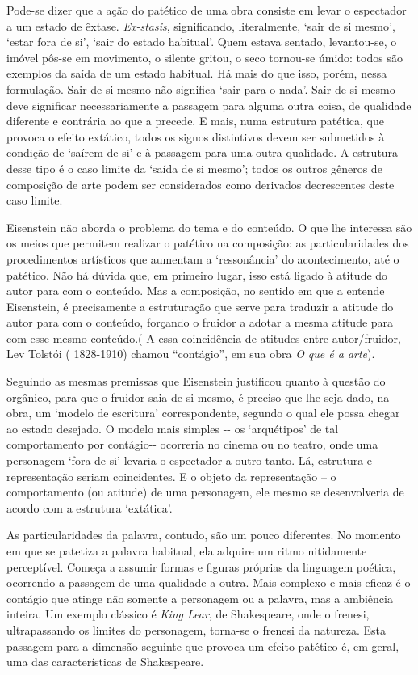 Pode-se dizer que a ação do patético de uma obra consiste em levar o
espectador a um estado de êxtase. \emph{Ex-stasis}, significando,
literalmente, `sair de si mesmo', `estar fora de si', `sair do estado
habitual'. Quem estava sentado, levantou-se, o imóvel pôs-se em
movimento, o silente gritou, o seco tornou-se úmido: todos são exemplos
da saída de um estado habitual. Há mais do que isso, porém, nessa
formulação. Sair de si mesmo não significa `sair para o nada'. Sair de
si mesmo deve significar necessariamente a passagem para alguma outra
coisa, de qualidade diferente e contrária ao que a precede. E mais, numa
estrutura patética, que provoca o efeito extático, todos os signos
distintivos devem ser submetidos à condição de `saírem de si' e à
passagem para uma outra qualidade. A estrutura desse tipo é o caso
limite da `saída de si mesmo'; todos os outros gêneros de composição de
arte podem ser considerados como derivados decrescentes deste caso
limite.

Eisenstein não aborda o problema do tema e do conteúdo. O que lhe
interessa são os meios que permitem realizar o patético na composição:
as particularidades dos procedimentos artísticos que aumentam a
`ressonância' do acontecimento, até o patético. Não há dúvida que, em
primeiro lugar, isso está ligado à atitude do autor para com o conteúdo.
Mas a composição, no sentido em que a entende Eisenstein, é precisamente
a estruturação que serve para traduzir a atitude do autor para com o
conteúdo, forçando o fruidor a adotar a mesma atitude para com esse
mesmo conteúdo.( A essa coincidência de atitudes entre autor/fruidor,
Lev Tolstói ( 1828-1910) chamou ``contágio'', em sua obra \emph{O que é
a arte}).

Seguindo as mesmas premissas que Eisenstein justificou quanto à questão
do orgânico, para que o fruidor saia de si mesmo, é preciso que lhe seja
dado, na obra, um `modelo de escritura' correspondente, segundo o qual
ele possa chegar ao estado desejado. O modelo mais simples -\/- os
`arquétipos' de tal comportamento por contágio-\/- ocorreria no cinema
ou no teatro, onde uma personagem `fora de si' levaria o espectador a
outro tanto. Lá, estrutura e representação seriam coincidentes. E o
objeto da representação -- o comportamento (ou atitude) de uma
personagem, ele mesmo se desenvolveria de acordo com a estrutura
`extática'.

As particularidades da palavra, contudo, são um pouco diferentes. No
momento em que se patetiza a palavra habitual, ela adquire um ritmo
nitidamente perceptível. Começa a assumir formas e figuras próprias da
linguagem poética, ocorrendo a passagem de uma qualidade a outra. Mais
complexo e mais eficaz é o contágio que atinge não somente a personagem
ou a palavra, mas a ambiência inteira. Um exemplo clássico é \emph{King
Lear}, de Shakespeare, onde o frenesi, ultrapassando os limites do
personagem, torna-se o frenesi da natureza. Esta passagem para a
dimensão seguinte que provoca um efeito patético é, em geral, uma das
características de Shakespeare.

